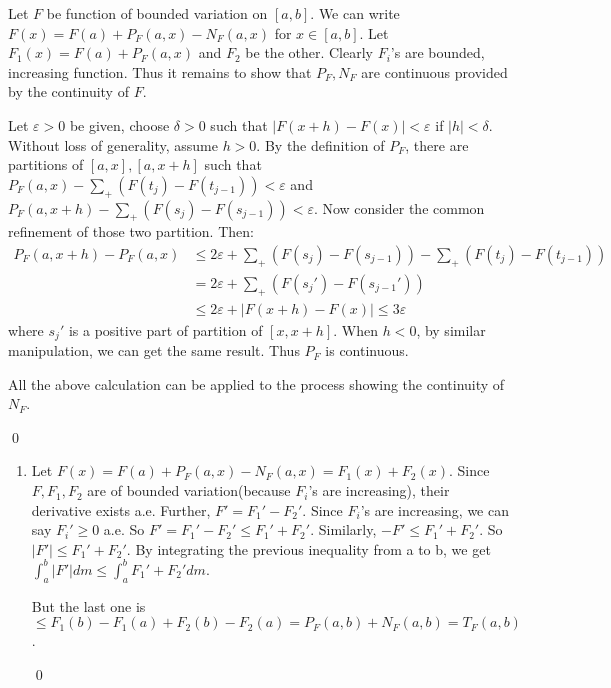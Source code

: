 \begin{problem}[3.15] \hfill

	Let $F$ be function of bounded variation on $[a, b]$.
	We can write $F(x) = F(a) + P_F(a, x) -N_F(a, x)$ for $x \in [a, b]$.
	Let $F_1(x) = F(a) + P_F(a, x)$ and $F_2$ be the other.
	Clearly $F_i$'s are bounded, increasing function.
	Thus it remains to show that $P_F, N_F$ are continuous provided by the continuity of $F$.

	Let $\varepsilon>0$ be given, choose $\delta>0$ such that $|F(x+h) - F(x)| < \varepsilon$ if $|h| < \delta$.
	Without loss of generality, assume $h>0$.
	By the definition of $P_F$, there are partitions of $[a, x], [a, x+h]$ such that $P_F(a, x) - \sum_{+}\left( F(t_j) - F(t_{j-1}) \right) < \varepsilon$ and $P_F(a, x+h) - \sum_{+} \left( F(s_j) - F(s_{j-1}) \right) < \varepsilon$.
	Now consider the common refinement of those two partition. Then:
	\[
		\begin{split}
			P_F(a, x+h) - P_F(a, x) 
			& \leq 2\varepsilon + \sum_{+}\left( F(s_j) - F(s_{j-1}) \right) - \sum_{+}\left( F(t_j) - F(t_{j-1}) \right) \\
			& = 2\varepsilon + \sum_{+}\left( F(s_j') - F(s_{j-1}') \right) \\
			& \leq 2\varepsilon + |F(x+h) - F(x)| \leq 3\varepsilon
		\end{split}
	\]
	where $s_j'$ is a positive part of partition of $[x, x+h]$.
	When $h<0$, by similar manipulation, we can get the same result.
	Thus $P_F$ is continuous.

	All the above calculation can be applied to the process showing the continuity of $N_F$.

	\qed

\end{problem}

\begin{problem}[3.16] \hfill
	\begin{enumerate}[label = (\alph*)]
		\item Let $F(x) = F(a) + P_F(a, x) - N_F(a, x) = F_1(x) + F_2(x)$.
			Since $F, F_1, F_2$ are of bounded variation(because $F_i$'s are increasing), their derivative exists a.e.
			Further, $F' = F_1' - F_2'$.
			Since $F_i$'s are increasing, we can say $F_i' \geq 0$ a.e.
			So $F' = F_1 ' - F_2' \leq F_1' + F_2'$.
			Similarly, $-F' \leq F_1' + F_2'$.
			So $|F'| \leq F_1' + F_2'$.
			By integrating the previous inequality from a to b, we get $\int_a^b |F'| dm \leq \int_a^b F_1' + F_2' dm$.

			But the last one is $ \leq F_1(b) - F_1(a) + F_2(b) - F_2(a) = P_F(a, b) + N_F(a, b) = T_F(a, b)$.

			\qed
	\end{enumerate}
	
\end{problem}

